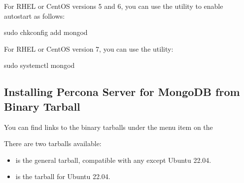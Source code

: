\documentclass[letterpaper,10pt,english]{sphinxmanual}
\begin{document}
\sphinxAtStartPar
For RHEL or CentOS versions 5 and 6, you can use the  utility
to enable auto\sphinxhyphen{}start as follows:

\begin{sphinxVerbatim}[commandchars=\\\{\}]
\PYGZdl{} sudo chkconfig \PYGZhy{}\PYGZhy{}add mongod
\end{sphinxVerbatim}

\sphinxAtStartPar
For RHEL or CentOS version 7, you can use the  utility:

\begin{sphinxVerbatim}[commandchars=\\\{\}]
\PYGZdl{} sudo systemctl  mongod
\end{sphinxVerbatim}


\subsection{Installing Percona Server for MongoDB from Binary Tarball}
\label{\detokenize{install/tarball:installing-percona-server-for-mongodb-from-binary-tarball}}\label{\detokenize{install/tarball:tarball}}\label{\detokenize{install/tarball::doc}}
\sphinxAtStartPar
You can find links to the binary tarballs under the  menu item on the 

\sphinxAtStartPar
There are two tarballs available:
\begin{itemize}
\item {} 
\sphinxAtStartPar
{} is the general tarball, compatible with any  except Ubuntu 22.04.

\item {} 
\sphinxAtStartPar
{} is the tarball for Ubuntu 22.04.

\end{itemize}
\end{document}
